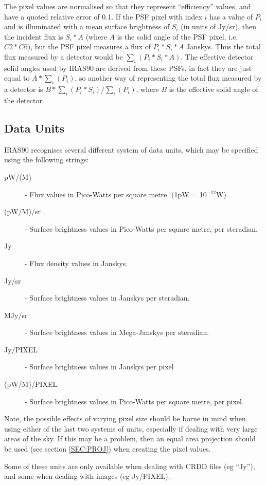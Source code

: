 The pixel values are normalised so that they represent ``efficiency''
values, and have a quoted relative error of 0.1. If the {\small PSF} pixel with
index $i$ has a value of $P_{i}$ and is illuminated with a mean surface
brightness of $S_{i}$ (in units of Jy/sr), then the incident flux is
$S_{i}*A$  (where $A$ is the solid angle of the {\small PSF} pixel,
i.e. $C2*C6$), but the {\small PSF} pixel measures a flux of
$P_{i}*S_{i}*A$ Janskys. Thus the total flux measured by a detector
would be $\sum_{i}( P_{i}*S_{i}*A)$. The effective detector solid
angles used by {\small IRAS90} are derived from these {\small PSF}s, in
fact they are just equal to $A*\sum_{i}(P_{i})$, so another way of
representing the total flux measured by a detector is $B*\sum_{i}(
P_{i}*S_{i} )/\sum_{i}( P_{i} )$, where $B$ is the effective solid
angle of the detector. 

\subsection{Data Units}
\label{SEC:UNITS}
{\small IRAS90} recognises several different system of data units, which 
may be specified using the following strings:

\begin{description}
\item [pW/(M\lsk{})] - Flux values in Pico-Watts per square metre. 
                          (1pW = 10$^{-12}$W)
\item [(pW/M\lsk{})/sr] - Surface brightness values in Pico-Watts per 
square metre, per steradian.
\item [Jy] - Flux density values in Janskys.
\item [Jy/sr] - Surface brightness values in Janskys per steradian.
\item [MJy/sr] - Surface brightness values in Mega-Janskys per steradian.
\item [Jy/PIXEL] - Surface brightness values in Janskys per pixel 
\item [(pW/M\lsk{})/PIXEL] - Surface brightness values in Pico-Watts per 
square metre, per pixel.
\end{description}
Note, the possible effects of varying pixel size should be borne
in mind when using either of the last two systems of units,
especially if dealing with very large areas of the sky. If this 
may be a problem, then an equal area projection should be used 
(see section \ref{SEC:PROJ}) when creating the pixel 
values.

Some of these units are only available when dealing with {\small CRDD}
files (eg ``Jy''), and some when dealing with images (eg Jy/PIXEL). 


